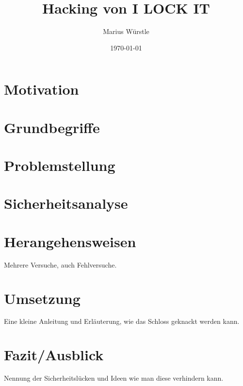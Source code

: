 \documentclass[a4paper]{article}
\title{Hacking von I LOCK IT}
\author{Marius Würstle}
\date{\today}
\begin{document}
	\maketitle
	\tableofcontents
	\pagebreak
	
	\section{Motivation}
	
	\section{Grundbegriffe}
	
	\section{Problemstellung}
	
	\section{Sicherheitsanalyse}
	
	\section{Herangehensweisen}
		Mehrere Versuche, auch Fehlversuche.
	
	\section{Umsetzung}
		Eine kleine Anleitung und Erläuterung, wie das Schloss geknackt werden kann.
		
	\section{Fazit/Ausblick}
		Nennung der Sicherheitslücken und Ideen wie man diese verhindern kann.
	
	
\end{document}
